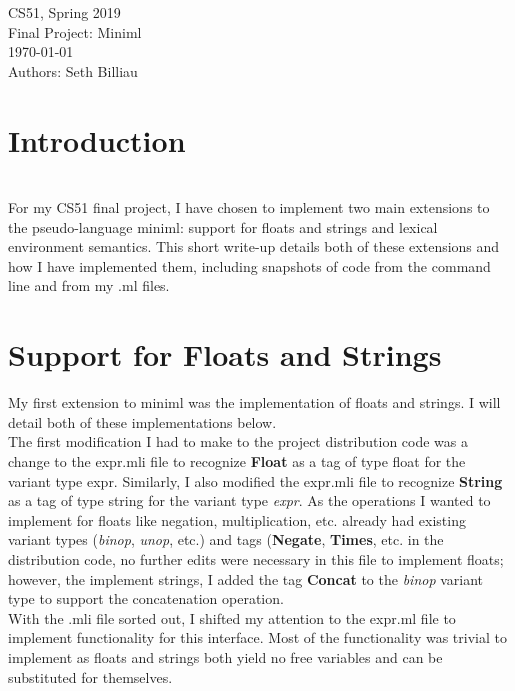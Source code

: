 \documentclass[12pt]{article}
\theoremstyle{definition}
\begin{document}
\begin{center}
CS51, Spring 2019  \\
Final Project: Miniml \\
\today 
\\
Authors: Seth Billiau
\end{center}
\section{Introduction} 
\\
For my CS51 final project, I have chosen to implement two main extensions to the pseudo-language miniml: support for floats and strings and lexical environment semantics. This short write-up details both of these extensions and how I have implemented them, including snapshots of code from the command line and from my .ml files. 

\section{Support for Floats and Strings}

My first extension to miniml was the implementation of floats and strings. I will detail both of these implementations below.\\

The first modification I had to make to the project distribution code was a change to the expr.mli file to recognize \textbf{Float} as a tag of type float for the variant type expr. Similarly, I also modified the expr.mli file to recognize \textbf{String} as a tag of type string for the variant type \textit{expr}. As the operations I wanted to implement for floats like negation, multiplication, etc. already had existing variant types (\textit{binop}, \textit{unop}, etc.) and tags (\textbf{Negate}, \textbf{Times}, etc. in the distribution code, no further edits were necessary in this file to implement floats; however, the implement strings, I added the tag \textbf{Concat} to the \textit{binop} variant type to support the concatenation operation. \\

With the .mli file sorted out, I shifted my attention to the expr.ml file to implement functionality for this interface. Most of the functionality was trivial to implement as floats and strings both yield no free variables and can be substituted for themselves.\\ 
\end{document}
